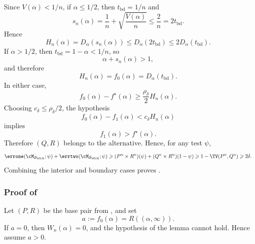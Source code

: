 \documentclass[english]{article}
\theoremstyle{plain}
\theoremstyle{definition}
\newcommand{\errsum}[1]{\errone(\cM_{\smlr};#1)+\errtwo(\cM_{\smlr};#1)}
\newcommand{\fnull}{f_0}
\newcommand{\falt}{f_1}
\newcommand{\smlr}{\mathcal{S}_{\mathrm{MLR}}}     %
\newcommand{\fstar}{f^\star}                       %
\begin{document}
Since \(V(\alpha)<1/n\), if \(\alpha\leqslant1/2\), then
\(t_{\mathrm{bd}}=1/n\) and
\[
s_n(\alpha)
=
\frac1n+\sqrt{\frac{V(\alpha)}{n}}
\leqslant
\frac2n
=
2t_{\mathrm{bd}}.
\]
Hence
\[
H_n(\alpha)
=
D_\alpha(s_n(\alpha))
\leqslant
D_\alpha(2t_{\mathrm{bd}})
\leqslant
2D_\alpha(t_{\mathrm{bd}}).
\]
If \(\alpha>1/2\), then \(t_{\mathrm{bd}}=1-\alpha<1/n\), so
\[
\alpha+s_n(\alpha)>1,
\]
and therefore
\[
H_n(\alpha)=\fnull(\alpha)=D_\alpha(t_{\mathrm{bd}}).
\]
In either case,
\[
\fnull(\alpha)-\fstar(\alpha)
\geqslant
\frac{\rho_\delta}{2}H_n(\alpha).
\]
Choosing \(c_\delta\leqslant\rho_\delta/2\), the hypothesis
\[
\fnull(\alpha)-\falt(\alpha)<c_\delta H_n(\alpha)
\]
implies
\[
\falt(\alpha)>\fstar(\alpha).
\]
Therefore \((Q,R)\) belongs to the alternative.  Hence, for any test
\(\psi\),
\[
\errsum{\psi}
\geqslant
(P^n\times R^n)(\psi)
+
(Q^n\times R^n)(1-\psi)
\geqslant
1-\TV(P^n,Q^n)
\geqslant
2\delta.
\]
Combining the interior and boundary cases proves
.


\subsubsection{Proof of }
Let \((P,R)\) be the base pair from , and set
\[
a:=\fnull(\alpha)=R((\alpha,\infty)).
\]
If \(a=0\), then \(W_n(\alpha)=0\), and the hypothesis of the lemma cannot
hold.  Hence assume \(a>0\).
\end{document}
